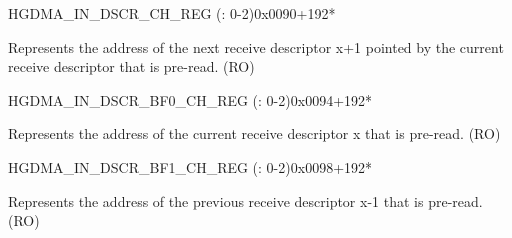 \begin{register}{H}{GDMA\_IN\_DSCR\_CH\_REG (: 0-2)}{0x0090+192*}\label{regdesc:GDMAINDSCRCHNREG}
%
\regnewline%
\begin{regdesc}\begin{reglist}
\label{fielddesc:GDMAINLINKDSCRCHN}\item [GDMA\_INLINK\_DSCR\_CH\regindex{n}] Represents the address of the next receive descriptor x+1 pointed by the current receive descriptor that is pre-read. (RO)
\end{reglist}\end{regdesc}
\end{register}


\begin{register}{H}{GDMA\_IN\_DSCR\_BF0\_CH\_REG (: 0-2)}{0x0094+192*}\label{regdesc:GDMAINDSCRBF0CHNREG}
%
\regnewline%
\begin{regdesc}\begin{reglist}
\label{fielddesc:GDMAINLINKDSCRBF0CHN}\item [GDMA\_INLINK\_DSCR\_BF0\_CH\regindex{n}] Represents the address of the current receive descriptor x that is pre-read. (RO)
\end{reglist}\end{regdesc}
\end{register}


\begin{register}{H}{GDMA\_IN\_DSCR\_BF1\_CH\_REG (: 0-2)}{0x0098+192*}\label{regdesc:GDMAINDSCRBF1CHNREG}
%
\regnewline%
\begin{regdesc}\begin{reglist}
\label{fielddesc:GDMAINLINKDSCRBF1CHN}\item [GDMA\_INLINK\_DSCR\_BF1\_CH\regindex{n}] Represents the address of the previous receive descriptor x-1 that is pre-read. (RO)
\end{reglist}\end{regdesc}
\end{register}


